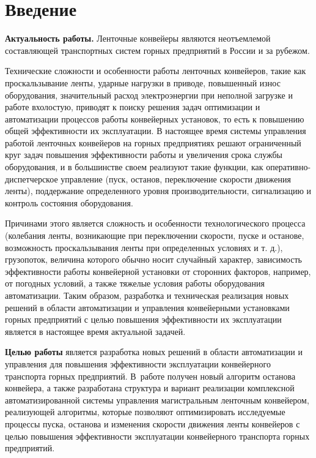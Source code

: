 \chapter*{Введение}							%

\textbf{Актуальность работы.}
Ленточные конвейеры являются неотъемлемой составляющей транспортных систем горных предприятий в России и за рубежом. 

Технические сложности и особенности работы ленточных конвейеров, такие как проскальзывание ленты, ударные нагрузки в приводе, повышенный износ оборудования, значительный расход электроэнергии при неполной загрузке и работе вхолостую, приводят к поиску решения задач оптимизации и автоматизации процессов работы конвейерных установок, то есть к повышению общей эффективности их эксплуатации. В настоящее время системы управления работой ленточных конвейеров на горных предприятиях решают ограниченный круг задач повышения эффективности работы и увеличения срока службы оборудования, и в большинстве своем реализуют такие функции, как оперативно-диспетчерское управление (пуск, останов, переключение скорости движения ленты), поддержание определенного уровня производительности, сигнализацию и контроль состояния оборудования.

Причинами этого является сложность и особенности технологического процесса (колебания ленты, возникающие при переключении скорости, пуске и останове, возможность проскальзывания ленты при определенных условиях и т. д.), грузопоток, величина которого обычно носит случайный характер, зависимость эффективности работы конвейерной установки от сторонних факторов, например, от погодных условий, а также тяжелые условия работы оборудования автоматизации. Таким образом, разработка и техническая реализация новых решений в области автоматизации и управления конвейерными установками горных предприятий с целью повышения эффективности их эксплуатации является в настоящее время актуальной задачей.
\bigskip

\textbf{Целью работы} является разработка новых решений в области автоматизации и управления для повышения эффективности эксплуатации конвейерного транспорта горных предприятий. В~работе получен новый алгоритм останова конвейера, а также разработана структура и вариант реализации комплексной автоматизированной системы управления магистральным ленточным конвейером, реализующей алгоритмы, которые позволяют оптимизировать исследуемые процессы пуска, останова и изменения скорости движения ленты конвейеров с целью повышения эффективности эксплуатации конвейерного транспорта горных предприятий.
\bigskip

